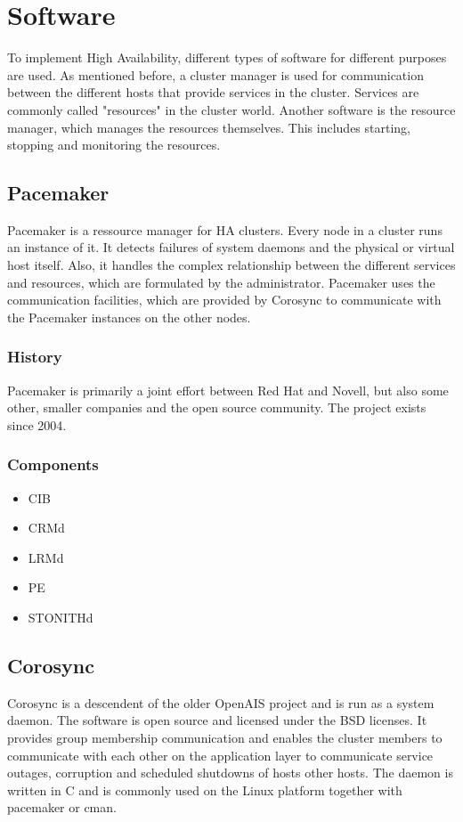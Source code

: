 \section{Software}
To implement High Availability, different types of software for different purposes are used.
As mentioned before, a cluster manager is used for communication between the different hosts that
provide services in the cluster. Services are commonly called "resources" in the cluster world.
Another software is the resource manager, which manages the resources themselves.
This includes starting, stopping and monitoring the resources.
\subsection{Pacemaker}
Pacemaker is a ressource manager for \ac{HA} clusters. Every node in a cluster
runs an instance of it. It detects failures of system daemons and the physical or
virtual host itself. Also, it handles the complex relationship between the different
services and resources, which are formulated by the administrator.
Pacemaker uses the communication facilities, which are provided by Corosync
to communicate with the Pacemaker instances on the other nodes.
\subsubsection{History}
Pacemaker is primarily a joint effort between Red Hat and Novell, but also
some other, smaller companies and the open source community. The project
exists since 2004.
\subsubsection{Components}
\begin{itemize}
\item \ac{CIB}
\item \ac{CRMd}
\item \ac{LRMd}
\item \ac{PE}
\item \ac{STONITHd}
\end{itemize}
\subsection{Corosync}
Corosync is a descendent of the older OpenAIS project and is run as a system daemon. The software is open source and licensed under the BSD licenses. It provides group membership communication and enables the cluster members to communicate with each other on the application layer to communicate service outages, corruption and scheduled shutdowns of hosts other hosts. The daemon is written in C and is commonly used on the Linux platform together with pacemaker or cman.

